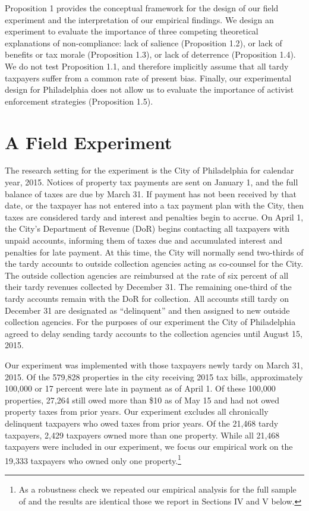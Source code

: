 Proposition 1 provides the conceptual framework for the design 
of our field experiment and the interpretation of our empirical findings. We design an experiment to evaluate the importance of three
competing theoretical explanations of non-compliance: lack of salience (Proposition 1.2), or lack of benefits or tax morale (Proposition 1.3), or lack of deterrence (Proposition 1.4). We do not test Proposition 1.1, and therefore implicitly assume that
all tardy taxpayers suffer from a common rate of present bias. Finally, our experimental design for Philadelphia does not allow us to evaluate the importance of 
activist enforcement strategies (Proposition 1.5). 

\section{A Field Experiment }


The research setting for the experiment is the City of Philadelphia
for calendar year, 2015.  Notices of property tax payments are sent on
January 1, and the full balance of taxes are due by March 31.  If
payment has not been received by that date, or the taxpayer has not
entered into a tax payment plan with the City, then taxes are
considered tardy and interest and penalties begin to accrue.  On
April 1, the City's Department of Revenue (DoR) begins contacting all
taxpayers with unpaid accounts, informing them of taxes due and
accumulated interest and penalties for late payment.  At this time,
the City will normally send two-thirds of the tardy accounts to outside collection agencies acting as co-counsel for the City. The outside collection agencies are reimbursed at the rate of six percent of all their tardy revenues collected by December 31. The remaining one-third of the tardy accounts remain with the DoR for collection. All accounts still tardy on December 31 are designated as ``delinquent'' and then assigned to new outside collection agencies. For the purposes of our experiment the City of Philadelphia agreed to delay sending tardy accounts to the collection agencies until August 15, 2015.

Our experiment was implemented with those taxpayers newly tardy on March 31, 2015. Of the 579,828 properties in the city receiving 2015 tax bills, approximately 100,000 or 17 percent were late in payment as of April 1. Of these 100,000 properties, 27,264 still owed more than \$10 as of May 15 and had not owed property taxes from prior years. Our experiment excludes all chronically delinquent taxpayers who owed taxes from prior years. Of the 21,468 tardy taxpayers, 2,429 taxpayers owned more than one property. While all 21,468 taxpayers were included in our experiment, we focus our empirical work on the 19,333 taxpayers who owned only one property.\footnote{ As a
  robustness check we repeated our empirical analysis for the full
  sample of and the results are identical those we report in Sections
  IV and V below. }  

